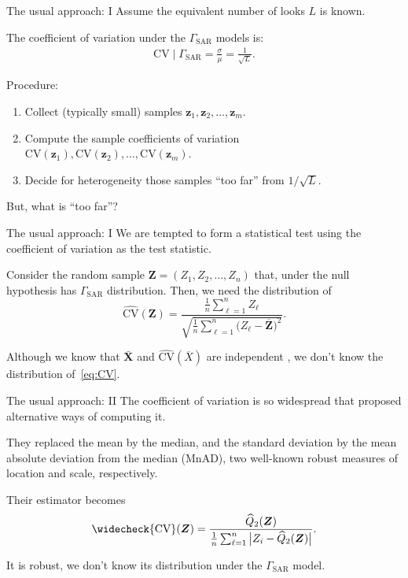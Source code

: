 \documentclass[table,aspectratio=169]{beamer}
\begin{document}
\begin{frame}{The usual approach: I}
Assume the equivalent number of looks $L$ is known.

The coefficient of variation under the $\Gamma_{\text{SAR}}$ models is:
\begin{align}
	\text{CV}\mid \Gamma_{\text{SAR}} =
	\frac{\sigma}{\mu} =
	 \frac{1}{\sqrt{L}}.
\end{align}

Procedure:
\begin{enumerate}
	\item Collect (typically small) samples $\bm z_1, \bm z_2, \dots, \bm z_m$.
	\item Compute the sample coefficients of variation $\text{CV}(\bm z_1),\text{CV}(\bm z_2), \dots, \text{CV}(\bm z_m)$.
	\item Decide for heterogeneity those samples ``too far'' from $1/\sqrt{L}$.
\end{enumerate}

But, what is ``too far''?
\end{frame}


\begin{frame}{The usual approach: I}
We are tempted to form a statistical test using the coefficient of variation as the test statistic.

Consider the random sample $\bm Z=(Z_1,Z_2,\dots,Z_n)$ that, under the null hypothesis has $\Gamma_{\text{SAR}}$ distribution.
Then, we need the distribution of
\begin{equation}
\widehat{\text{CV}}(\bm Z) = \frac{\frac1n \sum_{\ell=1}^n Z_\ell}{\sqrt{\frac1n \sum_{\ell=1}^n \big(Z_\ell-\overline{\bm Z}\big)^2}}.
\label{eq:CV}
\end{equation}

Although we know that $\bar{\bm X}$ and $\widehat{\text{CV}}(\overline X) $ are independent \citep{OnaCharacterizationoftheGammaDistributiontheIndependenceoftheSampleMeanandtheSampleCoefficientofVariation}, we don't know the distribution of~\eqref{eq:CV}.
\end{frame}

\begin{frame}{The usual approach: II}
The coefficient of variation is so widespread that \citet{Ospina2019} proposed alternative ways of computing it.

They replaced the mean by the median, and the standard deviation by the mean absolute deviation from the median (MnAD), two well-known robust measures of location and 
scale, respectively. 

Their estimator becomes
\begin{equation}
\widecheck{\text{CV}}(\bm Z) = \frac{\widehat{Q}_2(\bm Z)}{\frac1n \sum_{\ell=1}^n \big|Z_i-\widehat{Q}_2(\bm Z)\big|}.
\end{equation}

It is robust, we don't know its distribution under the $\Gamma_{\text{SAR}}$ model.
\end{frame}
\end{document}
